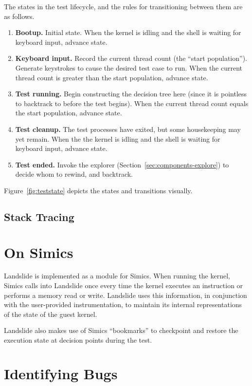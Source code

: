 The states in the test lifecycle, and the rules for transitioning between them are as follows.

\begin{enumerate}
	\item {\bf Bootup.} Initial state. When the kernel is idling and the shell is waiting for keyboard input, advance state.
	\item {\bf Keyboard input.} Record the current thread count (the ``start population''). Generate keystrokes to cause the desired test case to run.
		When the current thread count is greater than the start population, advance state.
	\item {\bf Test running.} Begin constructing the decision tree here (since it is pointless to backtrack to before the test begins). When the current thread count equals the start population, advance state.
	\item {\bf Test cleanup.} The test processes have exited, but some housekeeping may yet remain. When the the kernel is idling and the shell is waiting for keyboard input, advance state.
	\item {\bf Test ended.} Invoke the explorer (Section~\ref{sec:components-explore}) to decide whom to rewind, and backtrack.
\end{enumerate}

Figure~\ref{fig:teststate} depicts the states and transitions visually.

\subsection{Stack Tracing}

\section{On Simics}

Landslide is implemented as a module for Simics\cite{simics}. When running the kernel, Simics calls into Landslide once every time the kernel executes an instruction or performs a memory read or write. Landslide uses this information, in conjunction with the user-provided instrumentation, to maintain its internal representations of the state of the guest kernel.

Landslide also makes use of Simics ``bookmarks'' to checkpoint and restore the execution state at decision points during the test.

\section{Identifying Bugs}
\label{sec:techniques-bugs}

